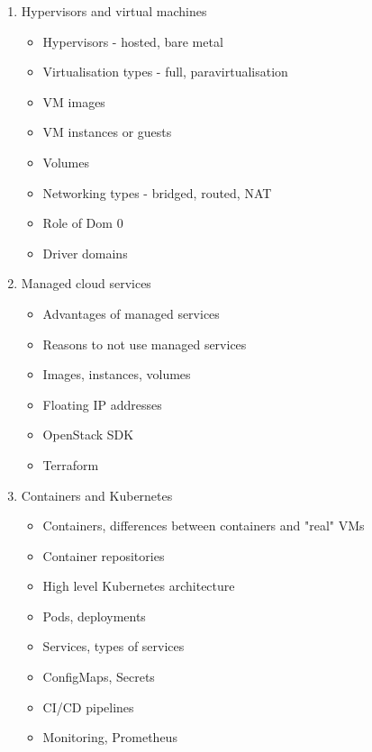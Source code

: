 \documentclass{article}
\begin{document}
\begin{enumerate}
  \item Hypervisors and virtual machines
    \begin{itemize}
      \item Hypervisors - hosted, bare metal
      \item Virtualisation types - full, paravirtualisation
      \item VM images
      \item VM instances or guests
      \item Volumes
      \item Networking types - bridged, routed, NAT
      \item Role of Dom 0
      \item Driver domains
    \end{itemize}
  \item Managed cloud services
    \begin{itemize}
      \item Advantages of managed services
      \item Reasons to not use managed services
      \item Images, instances, volumes
      \item Floating IP addresses
      \item OpenStack SDK
      \item Terraform
    \end{itemize}
    \pagebreak
  \item Containers and Kubernetes
    \begin{itemize}
      \item Containers, differences between containers and "real" VMs
      \item Container repositories
      \item High level Kubernetes architecture
      \item Pods, deployments
      \item Services, types of services
      \item ConfigMaps, Secrets
      \item CI/CD pipelines
      \item Monitoring, Prometheus
    \end{itemize}

\end{enumerate}
\end{document}
